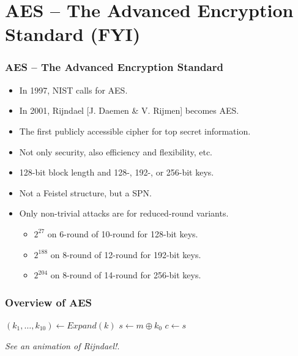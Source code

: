 \section{AES -- The Advanced Encryption Standard (FYI)}
\begin{frame}\frametitle{AES -- The Advanced Encryption Standard}
\begin{itemize}
\item In 1997, NIST calls for AES.
\item In 2001, Rijndael [J. Daemen \& V. Rijmen] becomes AES.
\item The first publicly accessible cipher for top secret information.
\item Not only security, also efficiency and flexibility, etc.
\item 128-bit block length and 128-, 192-, or 256-bit keys.
\item Not a Feistel structure, but a SPN.
\item Only non-trivial attacks are for reduced-round variants.
\begin{itemize}
\item $2^{27}$ on 6-round of 10-round for 128-bit keys.
\item $2^{188}$ on 8-round of 12-round for 192-bit keys.
\item $2^{204}$ on 8-round of 14-round for 256-bit keys. 
\end{itemize}
\end{itemize}
\end{frame}
\begin{frame}\frametitle{Overview of AES}
\begin{algorithm}[H]
\DontPrintSemicolon
\caption{$\mathsf{AES}$}
\BlankLine
$(k_{1},\dots,k_{10}) \gets Expand(k)$\;
$s \gets m\oplus k_{0}$\;
\Return $c \gets s$\;
\end{algorithm}
\emph{See an animation of Rijndael!}.
\end{frame}
